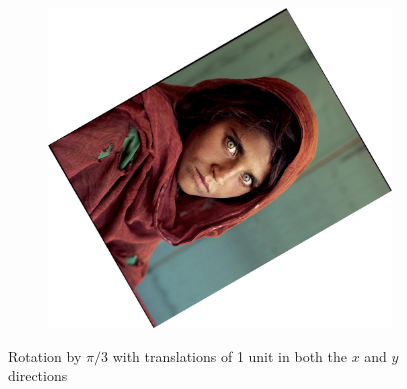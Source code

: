 \documentclass{article}
\begin{document}
\begin{figure}[H]
\begin{subfigure}{.3\textwidth}
    \end{subfigure}
    \begin{subfigure}{.3\textwidth}
        \centering
        \includegraphics[scale=0.04]{q1/output/similar_d:_3_s:_2.jpg}
    \end{subfigure}
    \caption{Rotation by \(\pi/3\) with translations of 1 unit in both the \(x\) and \(y\) directions}
\end{figure}
\end{document}

